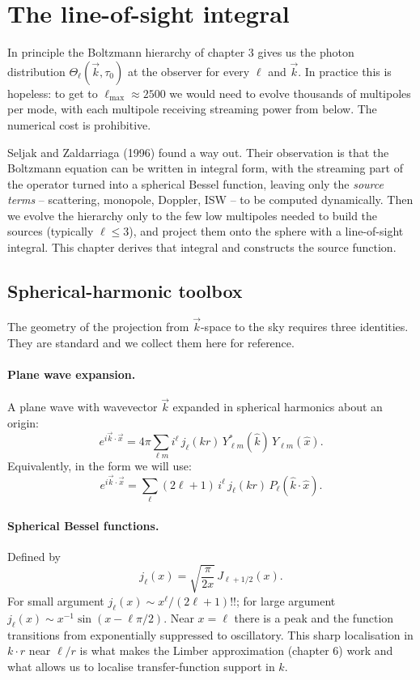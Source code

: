 \section{The line-of-sight integral}
\label{ch:los}

In principle the Boltzmann hierarchy of chapter 3 gives us the photon distribution $\Theta_\ell(\vec k, \tau_0)$ at the observer for every $\ell$ and $\vec k$. In practice this is hopeless: to get to $\ell_\mathrm{max} \approx 2500$ we would need to evolve thousands of multipoles per mode, with each multipole receiving streaming power from below. The numerical cost is prohibitive.

Seljak and Zaldarriaga (1996) found a way out. Their observation is that the Boltzmann equation can be written in integral form, with the streaming part of the operator turned into a spherical Bessel function, leaving only the \emph{source terms} -- scattering, monopole, Doppler, ISW -- to be computed dynamically. Then we evolve the hierarchy only to the few low multipoles needed to build the sources (typically $\ell \leq 3$), and project them onto the sphere with a line-of-sight integral. This chapter derives that integral and constructs the source function.

\subsection{Spherical-harmonic toolbox}

The geometry of the projection from $\vec k$-space to the sky requires three identities. They are standard and we collect them here for reference.

\paragraph{Plane wave expansion.} A plane wave with wavevector $\vec k$ expanded in spherical harmonics about an origin:
\begin{equation}
  e^{i\vec k \cdot \vec x} = 4\pi \sum_{\ell m} i^\ell\, j_\ell(kr)\, Y^*_{\ell m}(\hat k)\, Y_{\ell m}(\hat x).
  \label{eq:plane_wave_exp}
\end{equation}
Equivalently, in the form we will use:
\begin{equation}
  e^{i\vec k \cdot \vec x} = \sum_\ell (2\ell + 1)\, i^\ell\, j_\ell(kr)\, P_\ell(\hat k \cdot \hat x).
\end{equation}

\paragraph{Spherical Bessel functions.} Defined by
\[
  j_\ell(x) = \sqrt{\frac{\pi}{2 x}}\, J_{\ell + 1/2}(x).
\]
For small argument $j_\ell(x) \sim x^\ell/(2\ell + 1)!!$; for large argument $j_\ell(x) \sim x^{-1}\sin(x - \ell\pi/2)$. Near $x = \ell$ there is a peak and the function transitions from exponentially suppressed to oscillatory. This sharp localisation in $k \cdot r$ near $\ell/r$ is what makes the Limber approximation (chapter 6) work and what allows us to localise transfer-function support in $k$.

